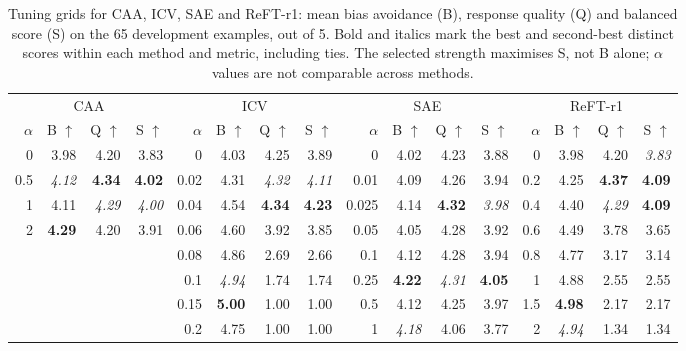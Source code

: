 \documentclass{article}
\begin{document}
\begin{table}[h]
  \caption{Tuning grids for CAA, ICV, SAE and ReFT-r1: mean bias avoidance (B), response quality (Q) and balanced score (S) on the 65 development examples, out of 5. Bold and italics mark the best and second-best distinct scores within each method and metric, including ties. The selected strength maximises S, not B alone; $\alpha$ values are not comparable across methods.}
  \label{tab:full-tuning}
  \centering\small
  \setlength{\tabcolsep}{2pt}
  \begin{tabular}{rrrrrrrrrrrrrrrr}
    \toprule
    \multicolumn{4}{c}{CAA} & \multicolumn{4}{c}{ICV} & \multicolumn{4}{c}{SAE} & \multicolumn{4}{c}{ReFT-r1} \\
    \cmidrule(lr){1-4}\cmidrule(lr){5-8}\cmidrule(lr){9-12}\cmidrule(lr){13-16}
    $\alpha$ & B $\uparrow$ & Q $\uparrow$ & S $\uparrow$ & $\alpha$ & B $\uparrow$ & Q $\uparrow$ & S $\uparrow$ & $\alpha$ & B $\uparrow$ & Q $\uparrow$ & S $\uparrow$ & $\alpha$ & B $\uparrow$ & Q $\uparrow$ & S $\uparrow$ \\
    \midrule
    0 & 3.98 & 4.20 & 3.83 & 0 & 4.03 & 4.25 & 3.89 & 0 & 4.02 & 4.23 & 3.88 & 0 & 3.98 & 4.20 & \textit{3.83} \\
    0.5 & \textit{4.12} & \textbf{4.34} & \textbf{4.02} & 0.02 & 4.31 & \textit{4.32} & \textit{4.11} & 0.01 & 4.09 & 4.26 & 3.94 & 0.2 & 4.25 & \textbf{4.37} & \textbf{4.09} \\
    1 & 4.11 & \textit{4.29} & \textit{4.00} & 0.04 & 4.54 & \textbf{4.34} & \textbf{4.23} & 0.025 & 4.14 & \textbf{4.32} & \textit{3.98} & 0.4 & 4.40 & \textit{4.29} & \textbf{4.09} \\
    2 & \textbf{4.29} & 4.20 & 3.91 & 0.06 & 4.60 & 3.92 & 3.85 & 0.05 & 4.05 & 4.28 & 3.92 & 0.6 & 4.49 & 3.78 & 3.65 \\
    & & & & 0.08 & 4.86 & 2.69 & 2.66 & 0.1 & 4.12 & 4.28 & 3.94 & 0.8 & 4.77 & 3.17 & 3.14 \\
    & & & & 0.1 & \textit{4.94} & 1.74 & 1.74 & 0.25 & \textbf{4.22} & \textit{4.31} & \textbf{4.05} & 1 & 4.88 & 2.55 & 2.55 \\
    & & & & 0.15 & \textbf{5.00} & 1.00 & 1.00 & 0.5 & 4.12 & 4.25 & 3.97 & 1.5 & \textbf{4.98} & 2.17 & 2.17 \\
    & & & & 0.2 & 4.75 & 1.00 & 1.00 & 1 & \textit{4.18} & 4.06 & 3.77 & 2 & \textit{4.94} & 1.34 & 1.34 \\
    \bottomrule
  \end{tabular}
\end{table}
\end{document}
